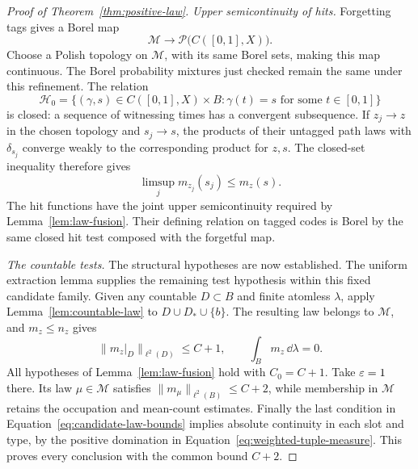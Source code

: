 \begin{proof}[Proof of Theorem~\ref{thm:positive-law}]
\smallskip\noindent
\emph{Upper semicontinuity of hits.}
Forgetting tags gives a Borel map
\[
 \mathcal M\longrightarrow
 \mathcal P\bigl(C([0,1],X)\bigr).
\]
Choose a Polish topology on \(\mathcal M\), with its same Borel sets,
making this map continuous.  The Borel probability mixtures just checked
remain the same under this refinement.  The relation
\[
 \mathcal H_0=
 \{(\gamma,s)\in C([0,1],X)\times B:\gamma(t)=s
                         \text{ for some }t\in[0,1]\}
\]
is closed: a sequence of witnessing times has a convergent subsequence.
If \(z_j\to z\) in the chosen topology and \(s_j\to s\), the products
of their untagged path laws with \(\delta_{s_j}\) converge weakly to the
corresponding product for \(z,s\).  The closed-set inequality therefore
gives
\[
 \limsup_jm_{z_j}(s_j)\le m_z(s).
\]
The hit functions have the joint upper semicontinuity required by
Lemma~\ref{lem:law-fusion}.  Their defining relation on tagged codes is
Borel by the same closed hit test composed with the forgetful map.

\smallskip\noindent
\emph{The countable tests.}
The structural hypotheses are now established.  The uniform extraction
lemma supplies the remaining test hypothesis within this fixed candidate
family.
Given any countable \(D\subset B\) and finite atomless \(\lambda\), apply
Lemma~\ref{lem:countable-law} to
\(D\cup D_*\cup\{b\}\).  The resulting law belongs to \(\mathcal M\),
and \(m_z\le n_z\) gives
\[
 \|m_z|_D\|_{\ell^2(D)}\le C+1,
 \qquad \int_Bm_z\,\dd\lambda=0.
\]
All hypotheses of Lemma~\ref{lem:law-fusion} hold with \(C_0=C+1\).
Take \(\varepsilon=1\) there.  Its law \(\mu\in\mathcal M\) satisfies
\(\|m_\mu\|_{\ell^2(B)}\le C+2\), while membership in \(\mathcal M\)
retains the occupation and mean-count estimates.  Finally the last
condition in Equation~\eqref{eq:candidate-law-bounds} implies absolute
continuity in each slot and type, by the positive domination in
Equation~\eqref{eq:weighted-tuple-measure}.  This proves every conclusion
with the common bound \(C+2\).
\end{proof}

